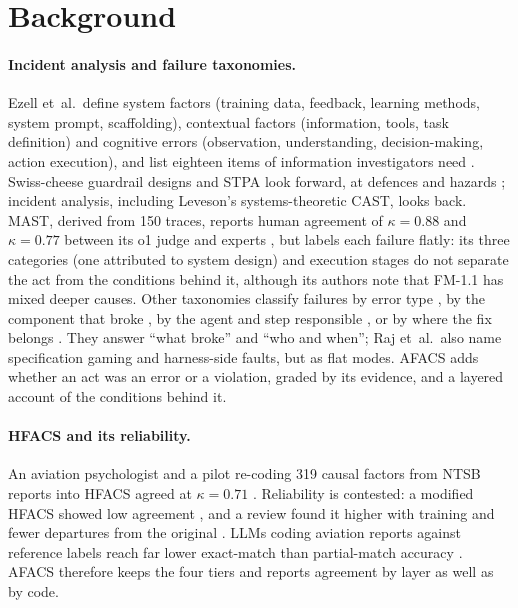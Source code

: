 \documentclass[10pt]{article}
\begin{document}
\section{Background}

\paragraph{Incident analysis and failure taxonomies.} Ezell et~al.\ define system
factors (training data, feedback, learning methods, system prompt, scaffolding),
contextual factors (information, tools, task definition) and cognitive errors
(observation, understanding, decision-making, action execution), and list
eighteen items of information investigators need \citep[Table~1]{ezell2025incident}. Swiss-cheese guardrail designs and STPA look
forward, at defences and hazards \citep{shamsujjoha2024swisscheese,leveson2012engineering,mylius2025stpa};
incident analysis, including Leveson's systems-theoretic CAST, looks back. MAST, derived from 150 traces, reports human
agreement of $\kappa=0.88$ and $\kappa=0.77$ between its o1 judge and
experts \citep{cemri2025mast}, but labels each failure flatly: its three categories
(one attributed to system design) and execution stages do not separate the act from
the conditions behind it, although its authors note that FM-1.1 has mixed deeper
causes. Other taxonomies classify
failures by error type \citep{deshpande2025trail}, by the component that
broke \citep{zhu2025agenterrorbench}, by the agent and step
responsible \citep{zhang2025whowhen}, or by where the fix
belongs \citep{raj2026modelharness}. They answer ``what broke'' and ``who and
when''; Raj et~al.\ also name specification gaming and harness-side faults, but as
flat modes. AFACS adds whether an act was an error or a violation, graded by its
evidence, and a layered account of the conditions behind it.

\paragraph{HFACS and its reliability.} An aviation psychologist and a pilot
re-coding 319 causal factors from NTSB reports into HFACS agreed at
$\kappa=0.71$ \citep{wiegmann2001commercial}. Reliability is contested: a modified
HFACS showed low agreement \citep{olsen2010hfacsadf}, and a review found it higher
with training and fewer departures from the
original \citep{cohen2015reliability}. LLMs coding aviation reports against
reference labels reach far lower exact-match than partial-match
accuracy \citep{ahmadi2025hfacsgrpo}. AFACS therefore keeps the four tiers and
reports agreement by layer as well as by code.
\end{document}
